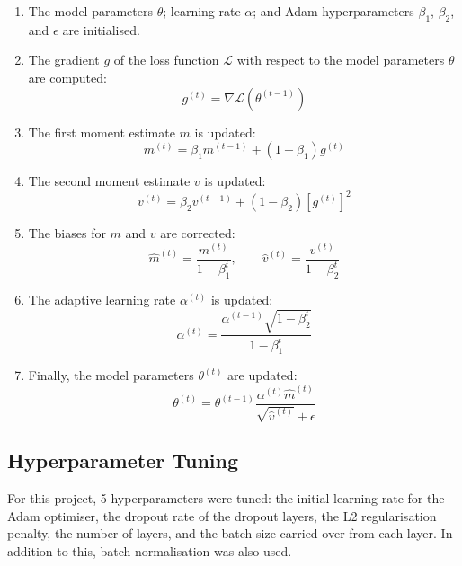 \documentclass[11pt,a4paper]{article}
\begin{document}
\begin{enumerate}
    \item The model parameters $\theta$; learning rate $\alpha$; and Adam hyperparameters $\beta_1$, $\beta_2$, and $\epsilon$ are initialised.
    \item The gradient $g$ of the loss function $\mathcal{L}$ with respect to the model parameters $\theta$ are computed:
        \begin{equation}
            g^{(t)} = \nabla \mathcal{L}(\theta^{(t-1)})
        \end{equation}
    \item The first moment estimate $m$ is updated:
        \begin{equation}
            m^{(t)} = \beta_1 m^{(t-1)} + (1-\beta_1)g^{(t)}
        \end{equation}
    \item The second moment estimate $v$ is updated:
        \begin{equation}
            v^{(t)} = \beta_2 v^{(t-1)} + (1-\beta_2)[g^{(t)}]^2
        \end{equation}
    \item The biases for $m$ and $v$ are corrected:
        \begin{equation}
            \hat{m}^{(t)} = \frac{m^{(t)}}{1-\beta^t_1}, \qquad
            \hat{v}^{(t)} = \frac{v^{(t)}}{1-\beta^t_2}
        \end{equation}
    \item The adaptive learning rate $\alpha^{(t)}$ is updated:
        \begin{equation}
            \alpha^{(t)} = \frac{\alpha^{(t-1)}\sqrt{1-\beta^t_2}}{1-\beta^t_1}
        \end{equation}
    \item Finally, the model parameters $\theta^{(t)}$ are updated:
        \begin{equation}
            \theta^{(t)} = \theta^{(t-1)}\frac{\alpha^{(t)}\hat{m}^{(t)}}{\sqrt{\hat{v}^{(t)}} + \epsilon}
        \end{equation}
\end{enumerate}

\subsection{Hyperparameter Tuning}
For this project, 5 hyperparameters were tuned: the initial learning rate for the Adam optimiser, the dropout rate of the dropout layers, the L2 regularisation penalty, the number of layers, and the batch size carried over from each layer. In addition to this, batch normalisation was also used.
\end{document}
